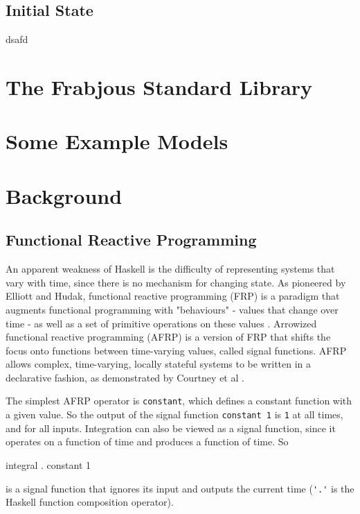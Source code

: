 \documentclass{article}
\begin{document}
\subsection{Initial State}
\label{initialState}

dsafd

\appendix{}
\section{The Frabjous Standard Library}





\section{Some Example Models}
\section{Background}





\subsection{Functional Reactive Programming}
 
  An apparent weakness of Haskell is the difficulty of representing systems that vary with time, since there is no mechanism for changing state.  As pioneered by Elliott and Hudak, functional reactive programming (FRP) is a paradigm that augments functional programming with "behaviours" - values that change over time - as well as a set of primitive operations on these values \cite{fran}. Arrowized functional reactive programming (AFRP) is a version of FRP that shifts the focus onto functions between time-varying values, called signal functions\cite{frpcont}. AFRP allows complex, time-varying, locally stateful systems to be written in a declarative fashion, as demonstrated by Courtney et al \cite{yampa}. 
  
  The simplest AFRP operator is \lstinline{constant}, which defines a constant function with a given value. So the output of the signal function \lstinline{constant 1} is \lstinline{1} at all times, and for all inputs. 
  Integration can also be viewed as a signal function, since it operates on a function of time and produces a function of time. So
\begin{code}
integral . constant 1
\end{code}
is a signal function that ignores its input and outputs the current time (\lstinline{'.'} is the Haskell function composition operator). 
\end{document}
